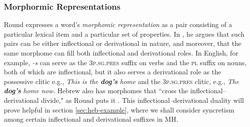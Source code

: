 
\subsubsection{Morphormic Representations}
Round expresses a word's \emph{morphomic representation} as a pair consisting of a particular lexical item and a particular set of properties.
 In \cite{round:2011}, he argues that such pairs can be either inflectional or derivational in nature, 
 and moreover, that the same morphome can fill both inflectional and derivational roles. In English, for example, \emph{-s} can serve
 as the \textsc{3p.sg.pres} suffix on verbs and the \textsc{pl} suffix on nouns, both of which are inflectional, but it also serves a derivational role as the possessive clitic e.g., \emph{This is the \textbf{dog's} home} and the \textsc{3p.sg.pres} clitic, e.g., \emph{The \textbf{dog's} home now.} Hebrew also has morphomes that ``cross the inflectional--derivational divide," as Round puts it \citep[][p.14]{round:2015}. This inflectional--derivational duality will prove helpful in section \ref{sec:heb-example}, where we shall consider syncretism among certain inflectional and derivational suffixes in \ac{MH}.

% 
  
